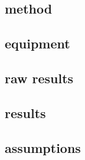 \documentclass[a4paper, 12pt, titlepage]{article}
\begin{document}

\subsection{method} %


\subsection{equipment} %


\subsection{raw results} %


\subsection{results} %


\subsection{assumptions} %



\newpage
\appendix
\end{document}
